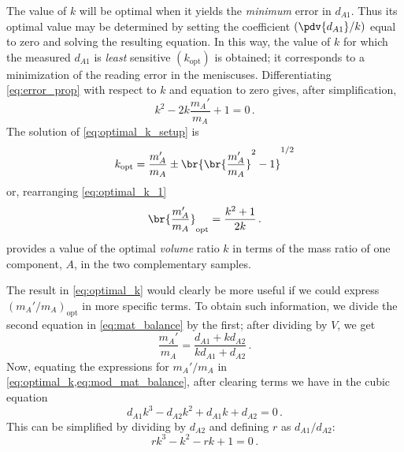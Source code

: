 The value of \(k\) will be optimal when it yields the \emph{minimum} error in \(d_{A1}\). 
Thus its optimal value may be determined by setting the coefficient \((\pdv{d_{A1}}/{k})\) equal to zero and solving the resulting equation. 
In this way, the value of \(k\) for which the measured \(d_{A1}\) is \emph{least} sensitive \((k_\text{opt})\) is obtained; it corresponds to a minimization of the reading error in the meniscuses. 
Differentiating \cref{eq:error_prop} with respect to \(k\) and equation to zero gives, after simplification, 
\begin{equation}
  k^2 - 2k \frac{m_A'}{m_A} + 1 = 0 \, .
  \label{eq:optimal_k_setup}
\end{equation}
The solution of \cref{eq:optimal_k_setup} is 
\begin{equation}
  k_\text{opt} = \frac{m_A'}{m_A} \pm \br{\br{\frac{m_A'}{m_A}}^2 - 1}^{1/2}
  \label{eq:optimal_k_1}
\end{equation}
or, rearranging \cref{eq:optimal_k_1}
\begin{equation}
  \br{\frac{m_A'}{m_A}}_\text{opt} = \frac{k^2 + 1}{2k} \, .
  \label{eq:optimal_k}
\end{equation}
 provides a value of the optimal \emph{volume} ratio \(k\) in terms of the mass ratio of one component, \(A\), in the two complementary samples.

The result in \cref{eq:optimal_k} would clearly be more useful if we could express \((m_A'/m_A)_\text{opt}\) in more specific terms. 
To obtain such information, we divide the second equation in \cref{eq:mat_balance} by the first; after dividing by \(V\), we get
\begin{equation}
  \frac{m_A'}{m_A} = \frac{d_{A1} + k d_{A2}}{k d_{A1} + d_{A2}} \, .
  \label{eq:mod_mat_balance}
\end{equation}
Now, equating the expressions for \(m_A'/m_A\) in \cref{eq:optimal_k,eq:mod_mat_balance}, after clearing terms we have in the cubic equation
\begin{equation}
  d_{A1} k^3 - d_{A2} k^2 + d_{A1} k + d_{A2} = 0 \, .
  \label{eq:cubic_mat_balance}
\end{equation}
This can be simplified by dividing by \(d_{A2}\) and defining \(r\) as \(d_{A1}/d_{A2}\):
\begin{equation}
  r k^3 - k^2 - r k + 1 = 0 \, .
  \label{eq:subst_mat_balance}
\end{equation}

